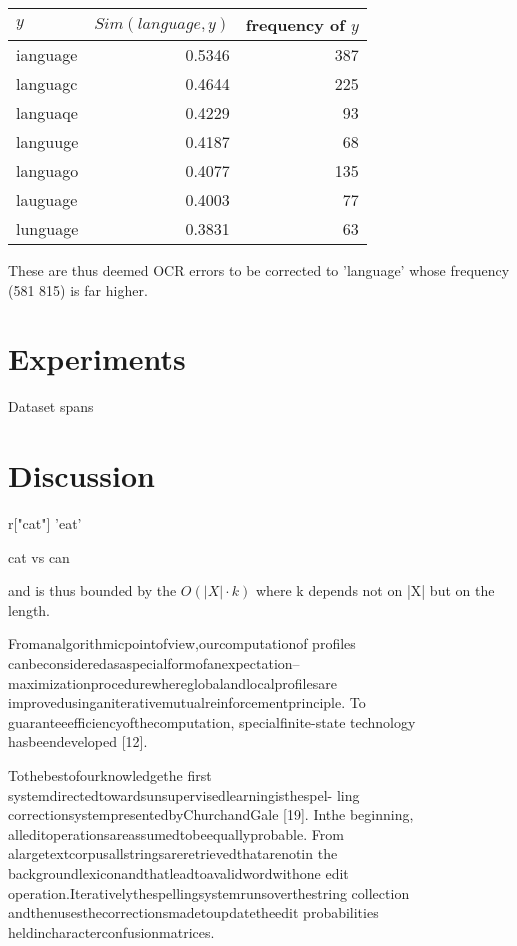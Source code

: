 \documentclass{sig-alternate}
\begin{document}
\begin{enumerate}
  \begin{tabular}{l|r r}
  $y$ & $Sim(language, y)$ & frequency of $y$\\ \hline
ianguage & 0.5346 & 387\\
languagc & 0.4644 & 225\\
languaqe & 0.4229 & 93\\
languuge & 0.4187 & 68\\
languago & 0.4077 & 135\\
lauguage & 0.4003 & 77\\
lunguage & 0.3831 & 63\\
\end{tabular}

  These are thus deemed OCR errors to be corrected to 'language'
  whose frequency (581 815) is far higher.
 \end{enumerate}

\section{Experiments}

Dataset spans 



\section{Discussion}



r["cat"]
'eat'

cat vs can



and is thus bounded
  by the $O(|X| \cdot k)$ where k depends not on |X| but on the
  length. 

Fromanalgorithmicpointofview,ourcomputationof
profiles canbeconsideredasaspecialformofanexpectation–
maximizationprocedurewhereglobalandlocalprofilesare
improvedusinganiterativemutualreinforcementprinciple.
To guaranteeefficiencyofthecomputation, specialfinite-state
technology hasbeendeveloped [12].


Tothebestofourknowledgethe
first systemdirectedtowardsunsupervisedlearningisthespel-
ling correctionsystempresentedbyChurchandGale [19]. Inthe
beginning, alleditoperationsareassumedtobeequallyprobable.
From alargetextcorpusallstringsareretrievedthatarenotin
the backgroundlexiconandthatleadtoavalidwordwithone
edit operation.Iterativelythespellingsystemrunsoverthestring
collection andthenusesthecorrectionsmadetoupdatetheedit
probabilities heldincharacterconfusionmatrices.
\end{document}
